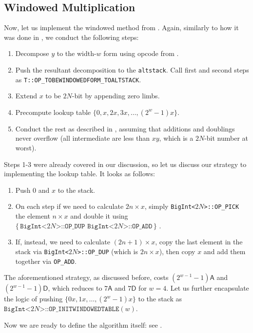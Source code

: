 \documentclass{iacrtrans}
\newcommand{\opcode}[1]{\, \texttt{#1} \,}
\newcommand{\script}[1]{ $\big\{ #1 \big\}$ }
\begin{document}
\subsection{Windowed Multiplication}

Now, let us implement the windowed method from . Again, similarly to how it was done in , we conduct the following steps: 
\begin{enumerate}
    \item Decompose $y$ to the width-$w$ form using opcode from .
    \item Push the resultant decomposition to the \texttt{altstack}. Call first and second steps as \texttt{T::OP\_TOBEWINDOWEDFORM\_TOALTSTACK}.
    \item Extend $x$ to be $2N$-bit by appending zero limbs.
    \item Precompute lookup table $\{0,x,2x,3x,\dots,(2^w-1)x\}$.
    \item Conduct the rest as described in , assuming that additions and doublings never overflow (all intermediate are less than $xy$, which is a $2N$-bit number at worst).
\end{enumerate}

Steps 1-3 were already covered in our discussion, so let us discuss our strategy to implementing the lookup table. It looks as follows:
\begin{enumerate}
    \item Push $0$ and $x$ to the stack.
    \item On each step if we need to calculate $2n \times x$, simply \texttt{BigInt<$2N$>::OP\_PICK} the element $n \times x$ and double it using \script{\opcode{BigInt<$2N$>::OP\_DUP} \opcode{BigInt<$2N$>::OP\_ADD}}.
    \item If, instead, we need to calculate $(2n+1) \times x$, copy the last element in the stack via \texttt{BigInt<$2N$>::OP\_DUP} (which is $2n \times x$), then copy $x$ and add them together via \texttt{OP\_ADD}.
\end{enumerate}

The aforementioned strategy, as discussed before, costs $(2^{w-1}-1)\mathsf{A}$ and $(2^{w-1}-1)\mathsf{D}$, which reduces to $7\mathsf{A}$ and $7\mathsf{D}$ for $w=4$. Let us further encapsulate the logic of pushing $\{0x,1x,\dots,(2^w-1)x\}$ to the stack as $\texttt{BigInt<$2N$>::OP\_INITWINDOWEDTABLE}(w)$.

Now we are ready to define the algorithm itself: see .
\end{document}
